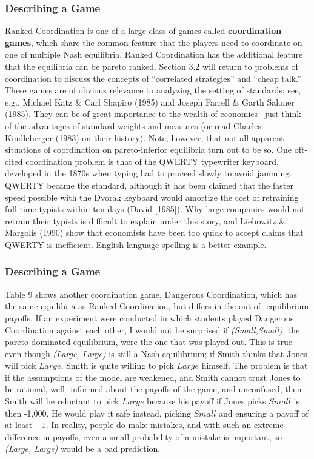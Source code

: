  \begin{frame}[fragile]\frametitle{Describing a Game}
  { Ranked Coordination }  is one of a large class of games called {\bf
coordination games}, which share the common feature   that the players need to
coordinate on one of multiple Nash equilibria.   { Ranked Coordination }  has
the additional feature that the equilibria can be pareto ranked.  Section 3.2
will  return  to problems of coordination to discuss the concepts of
``correlated strategies'' and ``cheap talk.'' These games are of obvious
relevance to analyzing the setting of standards; see, e.g., Michael Katz \&
Carl Shapiro (1985) and  Joseph Farrell \& Garth Saloner (1985).  They can be of
great importance to the wealth of economies-- just think of the advantages of
standard weights and measures (or read Charles Kindleberger (1983) on their
history). Note, however, that not all apparent situations of  coordination on
pareto-inferior equilibria turn out to be so.   One oft-cited coordination
problem  is that of the QWERTY typewriter keyboard, developed in the 1870s when
typing had to proceed slowly to avoid jamming. QWERTY became the standard,
although  it has been claimed that the faster speed possible with the Dvorak
keyboard would amortize the cost of retraining full-time typists within ten days
(David [1985]). Why large companies would not retrain their typists is
difficult to explain under this story, and Liebowitz \& Margolis (1990) show
that economists  have been  too quick to accept claims that QWERTY is
inefficient. English language  spelling   is  a better example.
\end{frame}
 \begin{frame}[fragile]\frametitle{Describing a Game}
 
Table  9 shows another coordination game, { Dangerous  Coordination,} which has
the  same equilibria as { Ranked Coordination,}  but differs in the out-of-
equilibrium payoffs.   If an experiment were conducted in which students played
{  Dangerous Coordination}  against each other, I would not be surprised if {\it
(Small,Small)}, the pareto-dominated equilibrium, were the one that was played
out.  This is true even though {\it (Large, Large)} is still  a Nash
equilibrium;   if Smith thinks that Jones will pick $Large$, Smith is quite
willing to pick $Large$ himself. The problem is that if the assumptions of the
model are weakened, and Smith cannot trust Jones to be rational,    well-
informed about the payoffs of the game, and    unconfused, then Smith will be
reluctant to pick $Large$  because his payoff if Jones picks $Small$ is then
-1,000.   He would play it safe instead, picking $Small$ and ensuring a payoff
of at least $-1$.     In reality, people do make mistakes, and with such an
extreme difference in payoffs, even a small probability of a mistake is
important, so {\it (Large, Large)} would be a bad prediction.

\end{frame}
